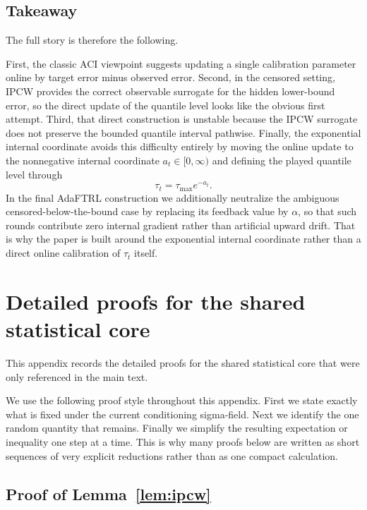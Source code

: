 \documentclass[11pt]{article}
\newcommand{\1}{\mathbf{1}}
\begin{document}
\subsection{Takeaway}

The full story is therefore the following.

First, the classic ACI viewpoint suggests updating a single calibration parameter online by target error minus observed error. Second, in the censored setting, IPCW provides the correct observable surrogate for the hidden lower-bound error, so the direct update of the quantile level looks like the obvious first attempt. Third, that direct construction is unstable because the IPCW surrogate does not preserve the bounded quantile interval pathwise. Finally, the exponential internal coordinate avoids this difficulty entirely by moving the online update to the nonnegative internal coordinate $a_t\in[0,\infty)$ and defining the played quantile level through
\[
\tau_t=\tau_{\max}e^{-a_t}.
\]
In the final AdaFTRL construction we additionally neutralize the ambiguous censored-below-the-bound case by replacing its feedback value by $\alpha$, so that such rounds contribute zero internal gradient rather than artificial upward drift. That is why the paper is built around the exponential internal coordinate rather than a direct online calibration of $\tau_t$ itself.


\section{Detailed proofs for the shared statistical core}
\label{app:core-proofs}

This appendix records the detailed proofs for the shared statistical core that were only referenced in the main text.

We use the following proof style throughout this appendix. First we state exactly what is fixed under the current conditioning sigma-field. Next we identify the one random quantity that remains. Finally we simplify the resulting expectation or inequality one step at a time. This is why many proofs below are written as short sequences of very explicit reductions rather than as one compact calculation.

\subsection{Proof of Lemma~\ref{lem:ipcw}}
\label{app:proof-ipcw}
\end{document}
